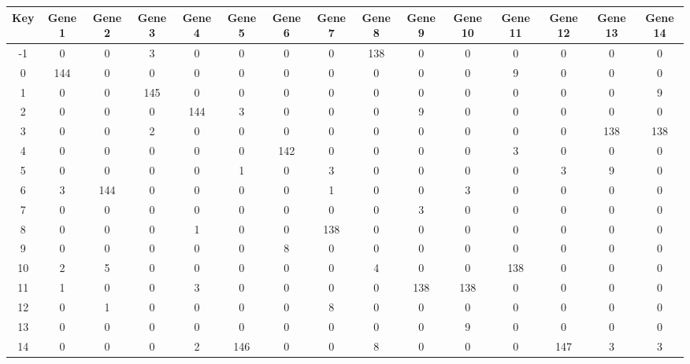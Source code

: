 \begin{tabular}{|c|c|c|c|c|c|c|c|c|c|c|c|c|c|c|}
\hline
Key & Gene 1 & Gene 2 & Gene 3 & Gene 4 & Gene 5 & Gene 6 & Gene 7 & Gene 8 & Gene 9 & Gene 10 & Gene 11 & Gene 12 & Gene 13 & Gene 14 \\
\hline
-1 & 0 & 0 & 3 & 0 & 0 & 0 & 0 & 138 & 0 & 0 & 0 & 0 & 0 & 0 \\
0 & 144 & 0 & 0 & 0 & 0 & 0 & 0 & 0 & 0 & 0 & 9 & 0 & 0 & 0 \\
1 & 0 & 0 & 145 & 0 & 0 & 0 & 0 & 0 & 0 & 0 & 0 & 0 & 0 & 9 \\
2 & 0 & 0 & 0 & 144 & 3 & 0 & 0 & 0 & 9 & 0 & 0 & 0 & 0 & 0 \\
3 & 0 & 0 & 2 & 0 & 0 & 0 & 0 & 0 & 0 & 0 & 0 & 0 & 138 & 138 \\
4 & 0 & 0 & 0 & 0 & 0 & 142 & 0 & 0 & 0 & 0 & 3 & 0 & 0 & 0 \\
5 & 0 & 0 & 0 & 0 & 1 & 0 & 3 & 0 & 0 & 0 & 0 & 3 & 9 & 0 \\
6 & 3 & 144 & 0 & 0 & 0 & 0 & 1 & 0 & 0 & 3 & 0 & 0 & 0 & 0 \\
7 & 0 & 0 & 0 & 0 & 0 & 0 & 0 & 0 & 3 & 0 & 0 & 0 & 0 & 0 \\
8 & 0 & 0 & 0 & 1 & 0 & 0 & 138 & 0 & 0 & 0 & 0 & 0 & 0 & 0 \\
9 & 0 & 0 & 0 & 0 & 0 & 8 & 0 & 0 & 0 & 0 & 0 & 0 & 0 & 0 \\
10 & 2 & 5 & 0 & 0 & 0 & 0 & 0 & 4 & 0 & 0 & 138 & 0 & 0 & 0 \\
11 & 1 & 0 & 0 & 3 & 0 & 0 & 0 & 0 & 138 & 138 & 0 & 0 & 0 & 0 \\
12 & 0 & 1 & 0 & 0 & 0 & 0 & 8 & 0 & 0 & 0 & 0 & 0 & 0 & 0 \\
13 & 0 & 0 & 0 & 0 & 0 & 0 & 0 & 0 & 0 & 9 & 0 & 0 & 0 & 0 \\
14 & 0 & 0 & 0 & 2 & 146 & 0 & 0 & 8 & 0 & 0 & 0 & 147 & 3 & 3 \\
\hline
\end{tabular}